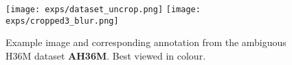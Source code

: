 \begin{figure}[t]
\begin{center}
    \texttt{[image: exps/dataset\_uncrop.png]}
    \texttt{[image: exps/cropped3\_blur.png]}
\end{center}
    \caption{Example image and corresponding annotation from the ambiguous H36M dataset \textbf{AH36M}. Best viewed in colour.\label{f:ambi_samples}}
\end{figure}